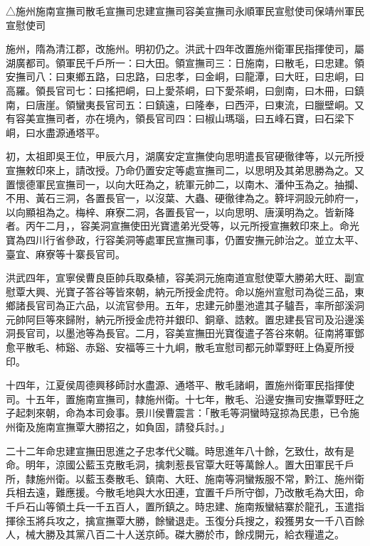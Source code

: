 \begin{pinyinscope}
△施州施南宣撫司散毛宣撫司忠建宣撫司容美宣撫司永順軍民宣慰使司保靖州軍民宣慰使司

施州，隋為清江郡，改施州。明初仍之。洪武十四年改置施州衛軍民指揮使司，屬湖廣都司。領軍民千戶所一：曰大田。領宣撫司三：日施南，曰散毛，曰忠建。領安撫司八：曰東鄉五路，曰忠路，曰忠孝，曰金峒，曰龍潭，曰大旺，曰忠峒，曰高羅。領長官司七：曰搖把峒，曰上愛茶峒，曰下愛茶峒，曰劍南，曰木冊，曰鎮南，曰唐崖。領蠻夷長官司五：曰鎮遠，曰隆奉，曰西泙，曰東流，曰臘壁峒。又有容美宣撫司者，亦在境內，領長官司四：曰椒山瑪瑙，曰五峰石寶，曰石梁下峒，曰水盡源通塔平。

初，太祖即吳王位，甲辰六月，湖廣安定宣撫使向思明遣長官硬徹律等，以元所授宣撫敕印來上，請改授。乃命仍置安定等處宣撫司二，以思明及其弟思勝為之。又置懷德軍民宣撫司一，以向大旺為之，統軍元帥二，以南木、潘仲玉為之。抽攔、不用、黃石三洞，各置長官一，以沒葉、大蟲、硬徹律為之。簳坪洞設元帥府一，以向顯祖為之。梅梓、麻寮二洞，各置長官一，以向思明、唐漢明為之。皆新降者。丙午二月，，容美洞宣撫使田光寶遣弟光受等，以元所授宣撫敕印來上。命光寶為四川行省參政，行容美洞等處軍民宣撫司事，仍置安撫元帥治之。並立太平、臺宜、麻寮等十寨長官司。

洪武四年，宣寧侯曹良臣帥兵取桑植，容美洞元施南道宣慰使覃大勝弟大旺、副宣慰覃大興、光寶子答谷等皆來朝，納元所授金虎符。命以施州宣慰司為從三品，東鄉諸長官司為正六品，以流官參用。五年，忠建元帥墨池遣其子驢吾，率所部溪洞元帥阿巨等來歸附，納元所授金虎符并銀印、銅章、誥敕。置忠建長官司及沿邊溪洞長官司，以墨池等為長官。二月，容美宣撫田光寶復遣子答谷來朝。征南將軍鄧愈平散毛、柿谿、赤谿、安福等三十九峒，散毛宣慰司都元帥覃野旺上偽夏所授印。

十四年，江夏侯周德興移師討水盡源、通塔平、散毛諸峒，置施州衛軍民指揮使司。十五年，置施南宣撫司，隸施州衛。十七年，散毛、沿邊安撫司安撫覃野旺之子起刺來朝，命為本司僉事。景川侯曹震言：「散毛等洞蠻時寇掠為民患，已令施州衛及施南宣撫覃大勝招之，如負固，請發兵討。」

二十二年命忠建宣撫田思進之子忠孝代父職。時思進年八十餘，乞致仕，故有是命。明年，涼國公藍玉克散毛洞，擒刺惹長官覃大旺等萬餘人。置大田軍民千戶所，隸施州衛。以藍玉奏散毛、鎮南、大旺、施南等洞蠻叛服不常，黔江、施州衛兵相去遠，難應援。今散毛地與大水田連，宜置千戶所守御，乃改散毛為大田，命千戶石山等領土兵一千五百人，置所鎮之。時忠建、施南叛蠻結寨於龍孔，玉遣指揮徐玉將兵攻之，擒宣撫覃大勝，餘蠻退走。玉復分兵搜之，殺獲男女一千八百餘人，械大勝及其黨八百二十人送京師。磔大勝於市，餘戍開元，給衣糧遣之。


\end{pinyinscope}
